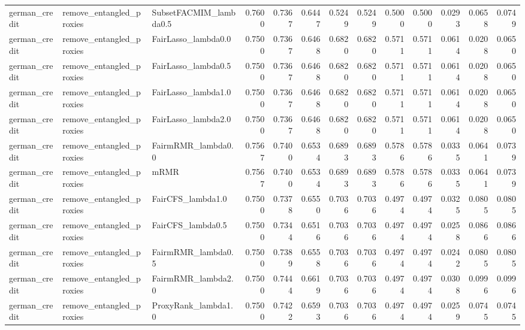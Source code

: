 \begin{tabular}{lllrrrrrrrrrr}
german_credit & remove_entangled_proxies & SubsetFACMIM_lambda0.5 & 0.7600 & 0.7367 & 0.6447 & 0.5249 & 0.5249 & 0.5000 & 0.5000 & 0.0293 & 0.0658 & 0.0749 \\
german_credit & remove_entangled_proxies & FairLasso_lambda0.0 & 0.7500 & 0.7367 & 0.6468 & 0.6820 & 0.6820 & 0.5711 & 0.5711 & 0.0614 & 0.0208 & 0.0650 \\
german_credit & remove_entangled_proxies & FairLasso_lambda0.5 & 0.7500 & 0.7367 & 0.6468 & 0.6820 & 0.6820 & 0.5711 & 0.5711 & 0.0614 & 0.0208 & 0.0650 \\
german_credit & remove_entangled_proxies & FairLasso_lambda1.0 & 0.7500 & 0.7367 & 0.6468 & 0.6820 & 0.6820 & 0.5711 & 0.5711 & 0.0614 & 0.0208 & 0.0650 \\
german_credit & remove_entangled_proxies & FairLasso_lambda2.0 & 0.7500 & 0.7367 & 0.6468 & 0.6820 & 0.6820 & 0.5711 & 0.5711 & 0.0614 & 0.0208 & 0.0650 \\
german_credit & remove_entangled_proxies & FairmRMR_lambda0.0 & 0.7567 & 0.7400 & 0.6534 & 0.6893 & 0.6893 & 0.5786 & 0.5786 & 0.0335 & 0.0641 & 0.0739 \\
german_credit & remove_entangled_proxies & mRMR & 0.7567 & 0.7400 & 0.6534 & 0.6893 & 0.6893 & 0.5786 & 0.5786 & 0.0335 & 0.0641 & 0.0739 \\
german_credit & remove_entangled_proxies & FairCFS_lambda1.0 & 0.7500 & 0.7378 & 0.6550 & 0.7036 & 0.7036 & 0.4974 & 0.4974 & 0.0325 & 0.0805 & 0.0805 \\
german_credit & remove_entangled_proxies & FairCFS_lambda0.5 & 0.7500 & 0.7344 & 0.6516 & 0.7036 & 0.7036 & 0.4974 & 0.4974 & 0.0258 & 0.0866 & 0.0866 \\
german_credit & remove_entangled_proxies & FairmRMR_lambda0.5 & 0.7500 & 0.7389 & 0.6558 & 0.7036 & 0.7036 & 0.4974 & 0.4974 & 0.0242 & 0.0805 & 0.0805 \\
german_credit & remove_entangled_proxies & FairmRMR_lambda2.0 & 0.7500 & 0.7444 & 0.6619 & 0.7036 & 0.7036 & 0.4974 & 0.4974 & 0.0308 & 0.0996 & 0.0996 \\
german_credit & remove_entangled_proxies & ProxyRank_lambda1.0 & 0.7500 & 0.7422 & 0.6593 & 0.7036 & 0.7036 & 0.4974 & 0.4974 & 0.0259 & 0.0745 & 0.0745 \\
\bottomrule
\end{tabular}

